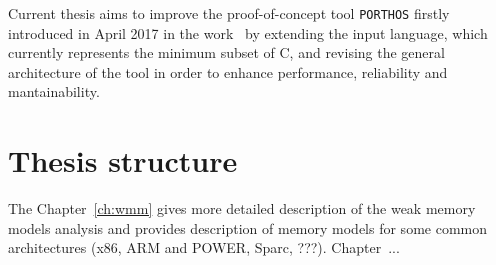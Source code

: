 Current thesis aims to improve the proof-of-concept tool \texttt{PORTHOS} firstly introduced in April 2017 in the work~\cite{Porthos17} by extending the input language, which currently represents the minimum subset of C, and revising the general architecture of the tool in order to enhance performance, reliability and mantainability.

\section{Thesis structure}
\label{ch:introduction:structure}

The Chapter~\ref{ch:wmm} gives more detailed description of the weak memory models analysis and provides description of memory models for some common architectures (x86, ARM and POWER, Sparc, ???). Chapter~...